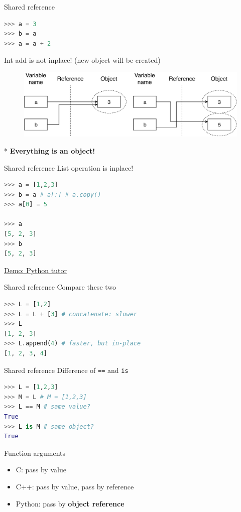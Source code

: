 \documentclass{../TexTemplate/myslide}
\begin{document}
\begin{frame}[fragile]{Shared reference}
\begin{lstlisting}[language=python]
>>> a = 3
>>> b = a
>>> a = a + 2
\end{lstlisting}
Int add is not inplace! (new object will be created)
\begin{figure}
\centering
\includegraphics[width=0.8\linewidth]{fig/python-share.pdf}
\end{figure}
* \textbf{Everything is an object!}
\end{frame}

\begin{frame}[fragile]{Shared reference}
List operation is inplace!
\begin{lstlisting}[language=python]
>>> a = [1,2,3]
>>> b = a # a[:] # a.copy()
>>> a[0] = 5

>>> a
[5, 2, 3]
>>> b
[5, 2, 3]
\end{lstlisting}
\href{http://pythontutor.com/visualize.html#code=a%20%3D%20%5B1,2%5D%0Ab%20%3D%20a%0Ac%20%3D%20a%5B%3A%5D&cumulative=false&curInstr=0&heapPrimitives=nevernest&mode=display&origin=opt-frontend.js&py=3&rawInputLstJSON=%5B%5D&textReferences=false}{Demo: Python tutor}
\end{frame}

\begin{frame}[fragile]{Shared reference}
Compare these two
\begin{lstlisting}[language=python]
>>> L = [1,2]
>>> L = L + [3] # concatenate: slower
>>> L
[1, 2, 3]
>>> L.append(4) # faster, but in-place
[1, 2, 3, 4]
\end{lstlisting}
\end{frame}

\begin{frame}[fragile]{Shared reference}
Difference of \verb'==' and \verb'is'
\begin{lstlisting}[language=python]
>>> L = [1,2,3]
>>> M = L # M = [1,2,3]
>>> L == M # same value?
True
>>> L is M # same object?
True
\end{lstlisting}
\end{frame}

\begin{frame}{Function arguments}
\begin{itemize}
	\item C: pass by value
	\item C++: pass by value, pass by reference
	\pause
	\item Python: pass by \textbf{object reference}
\end{itemize}
\end{frame}
\end{document}
